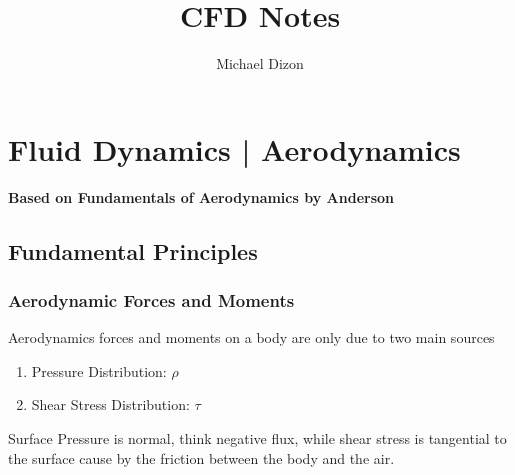 \documentclass{report}
\title{\Huge{CFD Notes}\\}
\author{\huge{Michael Dizon}}
\date{}
\begin{document}
\maketitle
\newpage%
\tableofcontents
\pagebreak

\chapter{Fluid Dynamics | Aerodynamics}
\textbf{Based on Fundamentals of Aerodynamics by Anderson}
\section{Fundamental Principles}
\subsection{Aerodynamic Forces and Moments}
Aerodynamics forces and moments on a body are only due to two main sources
\begin{enumerate}
    \item Pressure Distribution: $\rho$
    \item Shear Stress Distribution: $\tau$
\end{enumerate}
Surface Pressure is normal, think negative flux, while shear stress is tangential to the surface cause
by the friction between the body and the air.
\end{document}
